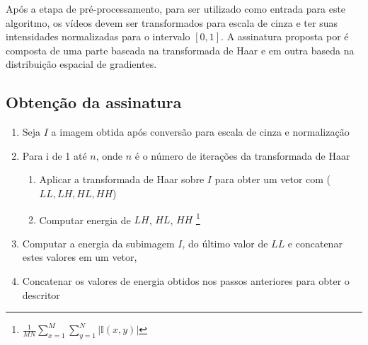Após a etapa de pré-processamento, para ser utilizado como entrada para este algoritmo, os vídeos devem ser transformados para escala de cinza e ter suas intensidades normalizadas para o intervalo $[0,1]$. A assinatura proposta por \citeauthor{Dutta2013} é composta de uma parte baseada na transformada de Haar e em  outra baseda na distribuição espacial de gradientes.

\subsection{Obtenção da assinatura}

\begin{enumerate}
\item Seja $I$ a imagem obtida após conversão para escala de cinza e normalização
\item Para i de 1 até $n$, onde $n$ é o número de iterações da transformada de Haar
  \begin{enumerate}
    \item Aplicar a transformada de Haar sobre $I$ para obter um vetor com ($LL, LH, HL, HH$)
    \item Computar energia de $LH$, $HL$, $HH$ \footnote{$  \frac{1}{MN}\sum_{x=1}^M \sum_{y=1}^N |\mathbb{I}(x,y)|$}
  \end{enumerate}
\item Computar a energia da subimagem $I$, do último valor de $LL$ e concatenar estes valores em um vetor,
\item Concatenar os valores de energia obtidos nos passos anteriores para obter o descritor
\end{enumerate}

